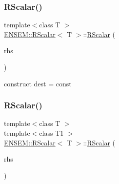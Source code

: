 \mbox{\label{classENSEM_1_1RScalar_a49babd15684b91b796da264d2aa2681f}} 
\subsubsection{\texorpdfstring{RScalar()}{RScalar()}\hspace{0.1cm}{\footnotesize\ttfamily [7/15]}}
{\footnotesize\ttfamily template$<$class T $>$ \\
\mbox{\hyperlink{classENSEM_1_1RScalar}{E\+N\+S\+E\+M\+::\+R\+Scalar}}$<$ T $>$\+::\mbox{\hyperlink{classENSEM_1_1RScalar}{R\+Scalar}} (\begin{DoxyParamCaption}\item[{const typename \mbox{\hyperlink{structENSEM_1_1WordType}{Word\+Type}}$<$ T $>$\+::Type\+\_\+t \&}]{rhs }\end{DoxyParamCaption})\hspace{0.3cm}{\ttfamily [inline]}}



construct dest = const 

\mbox{\label{classENSEM_1_1RScalar_a93e56021a00d35af008ae72de2eb60f2}} 
\subsubsection{\texorpdfstring{RScalar()}{RScalar()}\hspace{0.1cm}{\footnotesize\ttfamily [8/15]}}
{\footnotesize\ttfamily template$<$class T $>$ \\
template$<$class T1 $>$ \\
\mbox{\hyperlink{classENSEM_1_1RScalar}{E\+N\+S\+E\+M\+::\+R\+Scalar}}$<$ T $>$\+::\mbox{\hyperlink{classENSEM_1_1RScalar}{R\+Scalar}} (\begin{DoxyParamCaption}\item[{const \mbox{\hyperlink{classENSEM_1_1RScalar}{R\+Scalar}}$<$ T1 $>$ \&}]{rhs }\end{DoxyParamCaption})\hspace{0.3cm}{\ttfamily [inline]}}




